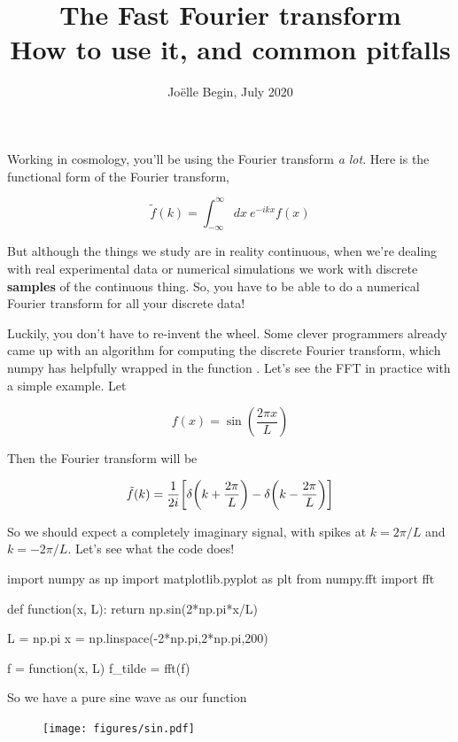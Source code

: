 \documentclass[a4paper]{article}
\title{The Fast Fourier transform \\
\large How to use it, and common pitfalls}
\author{Jo\"elle Begin, July 2020}
\date{}
\begin{document}
\maketitle

Working in cosmology, you'll be using the Fourier transform \textit{a lot}. Here is the functional form of the Fourier transform, 

\begin{equation*}
    \tilde{f}(k) = \int _{-\infty}^{\infty} dx \  e^{-ikx} f(x)
\end{equation*}

But although the things we study are in reality continuous, when we're dealing with real experimental data or numerical simulations we work with discrete \textbf{samples} of the continuous thing. So, you have to be able to do a numerical Fourier transform for all your discrete data!

Luckily, you don't have to re-invent the wheel. Some clever programmers already came up with an algorithm for computing the discrete Fourier transform, which numpy has helpfully wrapped in the function . Let's see the FFT in practice with a simple example. Let 

\begin{equation*}
    f(x) = \sin(\frac{2\pi x}{L})
\end{equation*}

Then the Fourier transform will be 

\begin{equation*}
    \tilde{f}(k) = \frac{1}{2i}\qty[\delta \qty(k + \frac{2\pi}{L}) - \delta \qty(k - \frac{2\pi}{L})]
\end{equation*}

So we should expect a completely imaginary signal, with spikes at $k = 2\pi/L$ and $k = -2\pi/L$. Let's see what the code does!


\begin{pyin}
import numpy as np
import matplotlib.pyplot as plt 
from numpy.fft import fft
    
def function(x, L):
    return np.sin(2*np.pi*x/L)

L = np.pi
x = np.linspace(-2*np.pi,2*np.pi,200)

f = function(x, L)
f_tilde = fft(f)
\end{pyin}
    
So we have a pure sine wave as our function 

\begin{figure}[H]
    \centering
    \texttt{[image: figures/sin.pdf]}
\end{figure}
\end{document}
